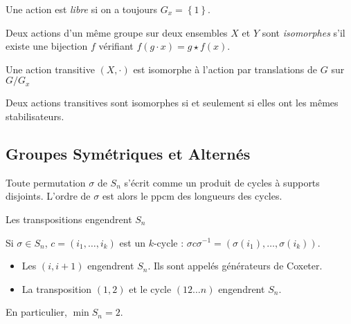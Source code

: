 \documentclass{cours}
\begin{document}
\begin{definition}
    Une action est \emph{libre} si on a toujours $G_{x} = \left\{1\right\}$.
\end{definition}

\begin{definition}
    Deux actions d'un même groupe sur deux ensembles $X$ et $Y$ sont \emph{isomorphes} s'il existe une bijection $f$ vérifiant $f(g \cdot x) = g \star f(x)$. 
\end{definition}


\begin{proposition}
    Une action transitive $\left(X, \cdot\right)$ est isomorphe à l'action par translations de $G$ sur $G/G_{x}$
\end{proposition}

\begin{proposition}
    Deux actions transitives sont isomorphes si et seulement si elles ont les mêmes stabilisateurs. 
\end{proposition}

\subsection{Groupes Symétriques et Alternés}
\begin{proposition}
    Toute permutation $\sigma$ de $S_{n}$ s'écrit comme un produit de cycles à supports disjoints. L'ordre de $\sigma$ est alors le ppcm des longueurs des cycles.
\end{proposition}

\begin{proposition}
    Les transpositions engendrent $S_{n}$
\end{proposition}
\begin{lemma}
    Si $\sigma \in S_{n}$, $c = \left(i_{1}, \ldots, i_{k}\right)$ est un $k$-cycle : $\sigma c\sigma^{-1} = \left(\sigma(i_{1}), \ldots, \sigma(i_{k})\right)$.
\end{lemma}

\begin{proposition}
    \begin{itemize}
        \item Les $(i, i+1)$ engendrent $S_{n}$. Ils sont appelés générateurs de Coxeter.
        \item La transposition $(1, 2)$ et le cycle $(1 2\ldots n)$ engendrent $S_{n}$.
    \end{itemize} 
    En particulier, $\min S_{n} = 2$.
\end{proposition}
\end{document}
